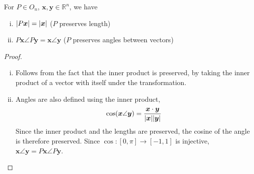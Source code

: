\documentclass{article}
\begin{document}
	\begin{corollary}
		For $P \in O_n$, $\bm x, \bm y \in \mathbb R^n$, we have
		\begin{enumerate}[(i)]
			\item $\abs{P\bm x} = \abs{\bm x}$ ($P$ preserves length)
			\item $P\bm x \angle P\bm y = \bm x \angle \bm y$ ($P$ preserves angles between vectors)
		\end{enumerate}
		\begin{proof}
			\begin{enumerate}[(i)]
				\item Follows from the fact that the inner product is preserved, by taking the inner product of a vector with itself under the transformation.
				\item Angles are also defined using the inner product,
				\[ \cos (\bm x \angle \bm y) = \frac{\bm x \cdot \bm y}{\abs{\bm x}\abs{\bm y}} \]
				Since the inner product and the lengths are preserved, the cosine of the angle is therefore preserved. Since $\cos\colon [0, \pi] \to [-1, 1]$ is injective, $\bm x \angle \bm y = P\bm x \angle P\bm y$.
			\end{enumerate}
		\end{proof}
	\end{corollary}
\end{document}
